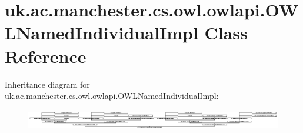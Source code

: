 \hypertarget{classuk_1_1ac_1_1manchester_1_1cs_1_1owl_1_1owlapi_1_1_o_w_l_named_individual_impl}{\section{uk.\-ac.\-manchester.\-cs.\-owl.\-owlapi.\-O\-W\-L\-Named\-Individual\-Impl Class Reference}
\label{classuk_1_1ac_1_1manchester_1_1cs_1_1owl_1_1owlapi_1_1_o_w_l_named_individual_impl}
}
Inheritance diagram for uk.\-ac.\-manchester.\-cs.\-owl.\-owlapi.\-O\-W\-L\-Named\-Individual\-Impl\-:\begin{figure}[H]
\begin{center}
\leavevmode
\includegraphics[height=0.925620cm]{classuk_1_1ac_1_1manchester_1_1cs_1_1owl_1_1owlapi_1_1_o_w_l_named_individual_impl}
\end{center}
\end{figure}
